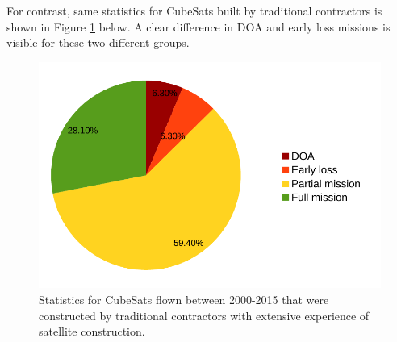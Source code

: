 \documentclass[english,12pt,a4paper,pdftex,elec,utf8]{aaltothesis}
\begin{document}
For contrast, same statistics for CubeSats built by traditional contractors is shown in Figure \ref{tradiotionalflown2015pic} below. A clear difference in DOA and early loss missions is visible for these two different groups.\par
\begin{figure}[h!]
\centering
\includegraphics[scale=0.5]{traditional2015}
\caption{Statistics for CubeSats flown between 2000-2015 that were constructed by traditional contractors with extensive experience of satellite construction. \cite{Swart2016}}
\label{tradiotionalflown2015pic}
\end{figure} 
\end{document}
